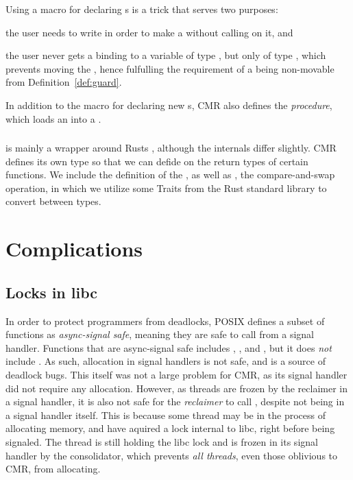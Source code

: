 Using a macro for declaring s is a trick that serves two purposes:
\begin{enumerate*}[1) ]
  \item the user needs to write  in order to make a  without calling
     on it,
  and\item the user never gets a binding to a variable of type , but only of type
    , which prevents moving the , hence fulfulling the requirement of a
     being non-movable from Definition~\ref{def:guard}.
\end{enumerate*}

In addition to the  macro for declaring new s, CMR also defines the
 \emph{procedure}, which loads an  into a .


\subsubsection{}

 is mainly a wrapper around Rusts , although the internals differ
slightly. CMR defines its own type so that we can defide on the return types of certain functions.
We include the definition of the , as well as , the compare-and-swap
operation, in which we utilize some Traits from the Rust standard library to convert between types.

\begin{figure}[hb]
  
\end{figure}

\section{Complications}


\subsection{Locks in libc\label{sec:alloc-lock}}

In order to protect programmers from deadlocks, POSIX defines a subset of functions as
\emph{async-signal safe}, meaning they are safe to call from a signal handler. Functions that are
async-signal safe includes , , and , but it does \emph{not}
include . As such, allocation in signal handlers is not safe, and is a source of
deadlock bugs. This itself was not a large problem for CMR, as its signal handler did not require
any allocation. However, as threads are frozen by the reclaimer in a signal handler, it is also not
safe for the \emph{reclaimer} to call , despite not being in a signal handler itself.
This is because some thread may be in the process of allocating memory, and have aquired a lock
internal to libc, right before being signaled. The thread is still holding the libc lock and is
frozen in its signal handler by the consolidator, which prevents \emph{all threads}, even those
oblivious to CMR, from allocating.

